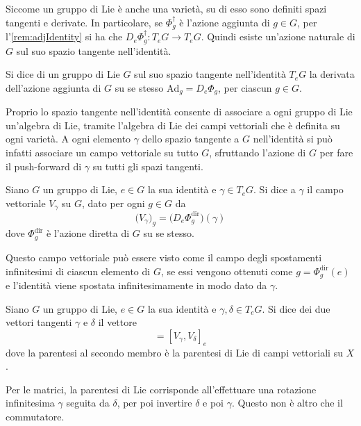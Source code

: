 Siccome un gruppo di Lie è anche una varietà, su di esso sono definiti spazi tangenti e derivate. In particolare, se $\Phi^{\dagger}_g$ è l'azione aggiunta di $g \in G$, per l'\autoref{rem:adjIdentity} si ha che $D_e \Phi^{\dagger}_g: T_e G \to T_e G$. Quindi esiste un'azione naturale di $G$ sul suo spazio tangente nell'identità.
\begin{definition}
  Si dice  di un gruppo di Lie $G$ sul suo spazio tangente nell'identità $T_e G$ la derivata dell'azione aggiunta di $G$ su se stesso $\mathrm{Ad}_g = D_e \Phi_g$, per ciascun $g \in G$. 
\end{definition}

Proprio lo spazio tangente nell'identità consente di associare a ogni gruppo di Lie un'algebra di Lie, tramite l'algebra di Lie dei campi vettoriali che è definita su ogni varietà. A ogni elemento $\gamma$ dello spazio tangente a $G$ nell'identità si può infatti associare un campo vettoriale su tutto $G$, sfruttando l'azione di $G$ per fare il push-forward di $\gamma$ su tutti gli spazi tangenti.
\begin{definition}
  Siano $G$ un gruppo di Lie, $e \in G$ la sua identità e $\gamma \in T_e G$. Si dice  a $\gamma$ il campo vettoriale $V_\gamma$ su $G$, dato per ogni $g \in G$ da \begin{equation*}
  \big(V_\gamma\big)_g = \big(D_e \Phi^{\text{dir}}_g\big) (\gamma)
  \end{equation*} 
  dove $\Phi^{\text{dir}}_g$ è l'azione diretta di $G$ su se stesso.
\end{definition}
\begin{remark}
  Questo campo vettoriale può essere visto come il campo degli spostamenti infinitesimi di ciascun elemento di $G$, se essi vengono ottenuti come $g=\Phi^{\text{dir}}_g(e)$ e l'identità viene spostata infinitesimamente in modo dato da $\gamma$.
\end{remark}
\begin{definition}
  Siano $G$ un gruppo di Lie, $e \in G$ la sua identità e $\gamma, \delta \in T_e G$. Si dice  dei due vettori tangenti $\gamma$ e $\delta$ il vettore \begin{equation*}
  [\gamma,\delta] = [V_{\gamma}, V_{\delta}]_e
  \end{equation*} 
  dove la parentesi al secondo membro è la parentesi di Lie di campi vettoriali su $X$.
\end{definition}
\begin{remark}
  Per le matrici, la parentesi di Lie corrisponde all'effettuare una rotazione infinitesima $\gamma$ seguita da $\delta$, per poi invertire $\delta$ e poi $\gamma$. Questo non è altro che il commutatore.
\end{remark}
